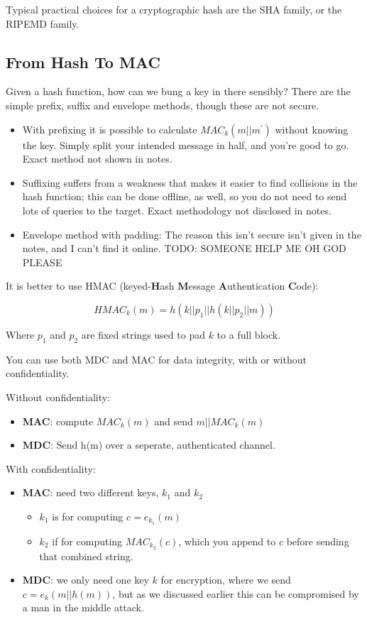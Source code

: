     Typical practical choices for a cryptographic hash are the SHA family, or the RIPEMD family.

    \subsection{From Hash To MAC}

    Given a hash function, how can we bung a key in there sensibly? There are the simple prefix, suffix and envelope methods, though these are not secure.
    \begin{itemize}
        \item With prefixing it is possible to calculate $MAC_{k}(m||m^{'})$ without knowing the key. Simply split your intended message in half, and you're good to go. Exact method not shown in notes.
        \item Suffixing suffers from a weakness that makes it easier to find collisions in the hash function; this can be done offline, as well, so you do not need to send lots of queries to the target. Exact methodology not disclosed in notes.
        \item Envelope method with padding: The reason this isn't secure isn't given in the notes, and I can't find it online. TODO: SOMEONE HELP ME OH GOD PLEASE
    \end{itemize}

    It is better to use HMAC (keyed-\textbf{H}ash \textbf{M}essage \textbf{A}uthentication \textbf{C}ode):

    $$HMAC_{k}(m) = h(k||p_{1}||h(k||p_{2}||m))$$

    Where $p_{1}$ and $p_{2}$ are fixed strings used to pad $k$ to a full block.

    You can use both MDC and MAC for data integrity, with or without confidentiality.

    Without confidentiality:
    \begin{itemize}
        \item \textbf{MAC}: compute $MAC_{k}(m)$ and send $m||MAC_{k}(m)$
        \item \textbf{MDC}: Send h(m) over a seperate, authenticated channel.
    \end{itemize}

    With confidentiality:
    \begin{itemize}
        \item \textbf{MAC}: need two different keys, $k_{1}$ and $k_{2}$
        \begin{itemize}
            \item $k_{1}$ is for computing $c = e_{k_{1}}(m)$
            \item $k_{2}$ if for computing $MAC_{k_{2}}(c)$, which you append to $c$ before sending that combined string.
        \end{itemize}
        \item \textbf{MDC}: we only need one key $k$ for encryption, where we send $c = e_{k}(m||h(m))$, but as we discussed earlier this can be compromised by a man in the middle attack.
    \end{itemize} 
